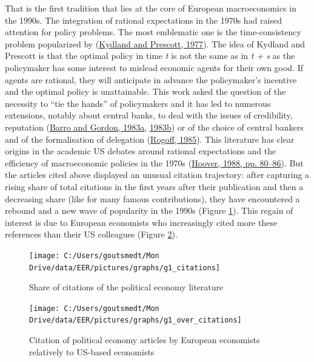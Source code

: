 \documentclass[]{elsarticle} %
\begin{document}
That is the first tradition that lies at the core of European
macroeconomics in the 1990s. The integration of rational expectations in
the 1970s had raised attention for policy problems. The most emblematic
one is the time-consistency problem popularized by
(\protect\hyperlink{ref-kydland1977}{Kydland and Prescott, 1977}). The
idea of Kydland and Prescott is that the optimal policy in time \emph{t}
is not the same as in \emph{t + s} as the policymaker has some interest
to mislead economic agents for their own good. If agents are rational,
they will anticipate in advance the policymaker's incentive and the
optimal policy is unattainable. This work asked the question of the
necessity to ``tie the hands'' of policymakers and it has led to
numerous extensions, notably about central banks, to deal with the
issues of credibility, reputation
(\protect\hyperlink{ref-barro1983}{Barro and Gordon, 1983a},
\protect\hyperlink{ref-barro1983c}{1983b}) or of the choice of central
bankers and of the formalisation of delegation
(\protect\hyperlink{ref-rogoff1985b}{Rogoff, 1985}). This literature has
clear origins in the academic US debates around rational expectations
and the efficiency of macroeconomic policies in the 1970s
(\protect\hyperlink{ref-hoover1988}{Hoover, 1988, pp. 80--86}). But the
articles cited above displayed an unusual citation trajectory: after
capturing a rising share of total citations in the first years after
their publication and then a decreasing share (like for many famous
contributions), they have encountered a rebound and a new wave of
popularity in the 1990s (Figure \ref{fig:plot-political-economy}). This
regain of interest is due to European economists who increasingly cited
more these references than their US colleagues (Figure
\ref{fig:plot-political-economy-europe}).

\begin{figure}[h]

{\centering \texttt{[image: C:/Users/goutsmedt/Mon Drive/data/EER/pictures/graphs/g1\_citations]} 

}

\caption{Share of citations of the political economy literature}\label{fig:plot-political-economy}
\end{figure}

\begin{figure}[h]

{\centering \texttt{[image: C:/Users/goutsmedt/Mon Drive/data/EER/pictures/graphs/g1\_over\_citations]} 

}

\caption{Citation of political economy articles by European economists relatively to US-based economists}\label{fig:plot-political-economy-europe}
\end{figure}
\end{document}
